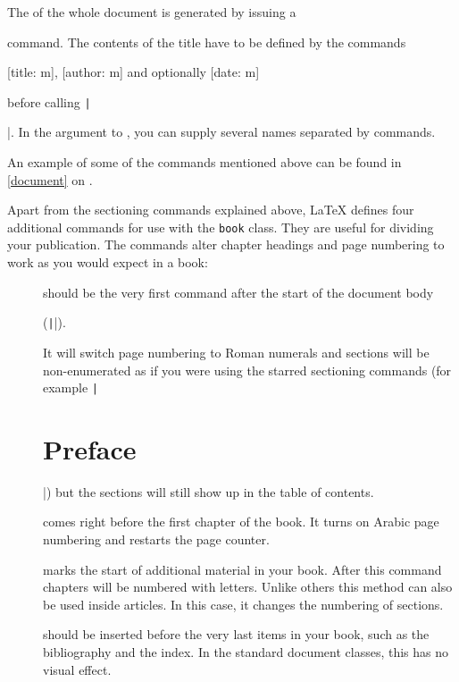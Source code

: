 The  of the whole document is generated by issuing a
\begin{lscommand}
\end{lscommand}
command. The contents of the title have to be defined by the commands
\begin{lscommand}
  [title: m], [author: m]
  and optionally [date: m]
\end{lscommand}
before calling \texttt|\maketitle|. In the argument to ,
you can supply several names separated by  commands.

An example of some of the commands mentioned above can be found in
\autoref{document} on .

Apart from the sectioning commands explained above, \LaTeX{} defines four
additional commands for use with the \texttt{book} class. They are useful for
dividing your publication. The commands alter chapter headings and page
numbering to work as you would expect in a book:
\begin{description}
  \item[] should be the very first command after the start of
    the document body
    \begin{chktexignore}
  (\texttt||).
\end{chktexignore}
    It will switch page
    numbering to Roman numerals and sections will be non-enumerated as if you were
    using the starred sectioning commands (for example
    \texttt|\chapter*{Preface}|) but the sections will still show up in
    the table of contents.
  \item[] comes right before the first chapter of
    the book. It turns on Arabic page numbering and restarts the page
    counter.
  \item[] marks the start of additional material in your book.
    After this command chapters will be numbered with letters. Unlike others
    this method can also be used inside articles. In this case, it changes the
    numbering of sections.
  \item[] should be inserted before the very last items
    in your book, such as the bibliography and the index. In the standard
    document classes, this has no visual effect.
\end{description}

